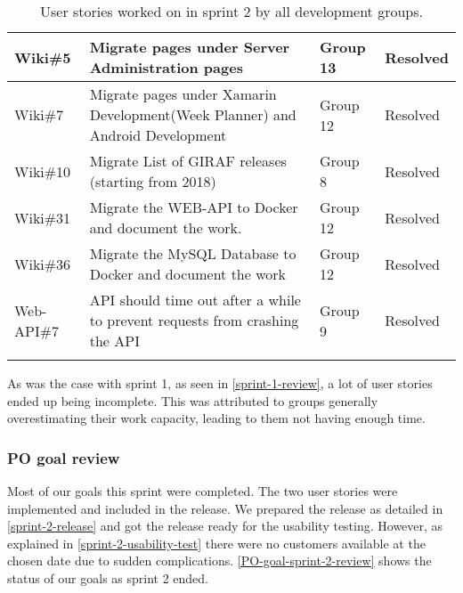 \begin{longtable}{|p{2.8cm}|p{7cm}|p{1.5cm}|p{1.8cm}|}
    Wiki\#5         & Migrate pages under Server Administration pages                                                                                                                                          & Group 13        & Resolved    \\ \hline
    Wiki\#7         & Migrate pages under Xamarin Development(Week Planner) and Android Development                                                                                                            & Group 12        & Resolved    \\ \hline
    Wiki\#10        & Migrate List of GIRAF releases (starting from 2018)                                                                                                                                      & Group 8         & Resolved    \\ \hline
    Wiki\#31        & Migrate the WEB-API to Docker and document the work.                                                                                                                                     & Group 12        & Resolved    \\ \hline
    Wiki\#36        & Migrate the MySQL Database to Docker and document the work                                                                                                                               & Group 12        & Resolved    \\ \hline
    Web-API\#7      & API should time out after a while to prevent requests from crashing the API                                                                                                              & Group 9         & Resolved    \\ \hline
    \caption{User stories worked on in sprint 2 by all development groups.}\label{sprint-2-review-table}
\end{longtable}
\noindent
As was the case with sprint 1, as seen in \autoref{sprint-1-review}, a lot of user stories ended up being incomplete.
This was attributed to groups generally overestimating their work capacity, leading to them not having enough time.

\subsubsection{PO goal review}
Most of our goals this sprint were completed.
The two user stories were implemented and included in the release. 
We prepared the release as detailed in \autoref{sprint-2-release} and got the release ready for the usability testing.
However, as explained in \autoref{sprint-2-usability-test} there were no customers available at the chosen date due to sudden complications.
\autoref{PO-goal-sprint-2-review} shows the status of our goals as sprint 2 ended.


